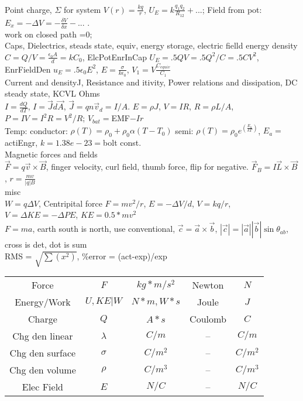 \documentclass{article}
\begin{document}
\begin{large}
\\Point charge, $\Sigma$ for system $V(r)=\frac{kq}{r}$, $U_E=k\frac{q_1q_2}{R_{12}}+$...; Field from pot: $E_x=-\Delta V=-\frac{\delta V}{\delta x}-$... .
\\work on closed path =0; 
\\\indent Caps, Dielectrics, steads state, equiv, energy storage, electric fielld energy density
\\$C=Q/V=\frac{\epsilon_0 A}{d}=kC_0$, ElcPotEnrInCap $U_E=.5 Q V =.5 Q^2/C = .5 C V^2$, EnrFieldDen $u_E=.5 \epsilon_0 E^2$, $E=\frac{\sigma}{k\epsilon_0}$, $V_1=V\frac{C_{equiv}}{C_1}$
\\\indent Current and densityJ, Resistance and itivity, Power relations and dissipation, DC steady state, KCVL Ohms
\\$I=\frac{dQ}{dT}$, $I=\vec J d\vec A$, $\vec J=q n \vec v_d=I/A$. $E=\rho J$, $V=IR$, $R=\rho L/A$, $P=IV=I^2R=V^2/R$; $V_{bat}=$EMF$-Ir$
\\Temp: conductor: $\rho(T)=\rho_0+\rho_0\alpha(T-T_0)$ semi: $\rho(T)=\rho_0e^{(\frac {E_a}{kT})}$, $E_a=$ actiEngr, $k=1.38e-23=$bolt const.
\\\indent Magnetic forces and fields
\\$\vec{F}=q \vec v \times \vec B$, finger velocity, curl field, thumb force, flip for negative. $\vec F_B=I \vec L \times \vec B$, $r=\frac{mv}{|q|B}$
\\\indent misc
\\$W=q\Delta V$, Centripital force $F=mv^2/r$, $E=-\Delta V/d$, $V=kq/r$, $V=\Delta KE=-\Delta PE$, $KE=0.5*mv^2$
\\$F=ma$, earth south is north, use conventional, $\vec c=\vec a \times\vec b$, $|\vec c|=|\vec a| |\vec b|\sin\theta_{ab}$, cross is det, dot is sum
\\RMS = $\sqrt{\sum(x^2)}$, \%error = (act-exp)/exp
\\
\begin{tabular}{ c c c c c }
Force 		& $F$ 		& $kg*m/s^2$ 	& Newton 		& $N$ \\
Energy/Work	& $U, KE | W$	& $N*m, W*s$ 	& Joule 		& $J$ \\
Charge 		& $Q$		& $A*s$ 		& Coulomb 	& $C$ \\
Chg den linear	& $\lambda$ 	& $C/m$		& -- 			& $C/m$ \\
Chg den surface	& $\sigma$ 	& $C/m^2$	& -- 			& $C/m^2$ \\
Chg den volume	& $\rho$ 		& $C/m^3$	& -- 			& $C/m^3$ \\
Elec Field 		& $E$		& $N/C$ 		& -- 			& $N/C$ \\

\end{tabular}
\end{large}
\end{document}
